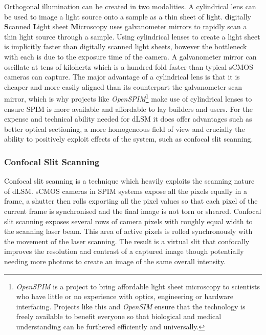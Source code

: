 Orthogonal illumination can be created in two modalities.
A cylindrical lens can be used to image a light source onto a sample as a thin sheet of light.
\textbf{d}igitally \textbf{S}canned \textbf{L}ight sheet \textbf{M}icroscopy uses galvanometer mirrors to rapidly scan a thin light source through a sample\cite{Keller2008}.
Using cylindrical lenses to create a light sheet is implicitly faster than digitally scanned light sheets, however the bottleneck with each is due to the exposure time of the camera. %
A galvanometer mirror can oscillate at tens of kilohertz which is a hundred fold faster than typical sCMOS cameras can capture.
The major advantage of a cylindrical lens is that it is cheaper and more easily aligned than its counterpart the galvanometer scan mirror, which is why projects like \textit{OpenSPIM}\footnote{\textit{OpenSPIM} is a project to bring affordable light sheet microscopy to scientists who have little or no experience with optics, engineering or hardware interfacing.
Projects like this and \textit{OpenSIM} ensure that the technology is freely available to benefit everyone so that biological and medical understanding can be furthered efficiently and universally.}\cite{Gualda2013,Pitrone2013} make use of cylindrical lenses to ensure SPIM is more available and affordable to lay builders and users.
For the expense and technical ability needed for dLSM it does offer advantages such as better optical sectioning, a more homogeneous field of view and crucially the ability to positively exploit effects of the system, such as confocal slit scanning.

\subsubsection{Confocal Slit Scanning}

Confocal slit scanning is a technique which heavily exploits the scanning nature of dLSM.
sCMOS cameras in SPIM systems expose all the pixels equally in a frame, a shutter then rolls exporting all the pixel values so that each pixel of the current frame is synchronised and the final image is not torn or sheared.
 Confocal slit scanning exposes several rows of camera pixels with roughly equal width to  the scanning laser beam.
This area of active pixels is rolled synchronously with the movement of the laser scanning.
The result is a virtual slit that confocally improves the resolution and contrast of a captured image though potentially needing more photons to create an image of the same overall intensity\cite{Baumgart2012}.

